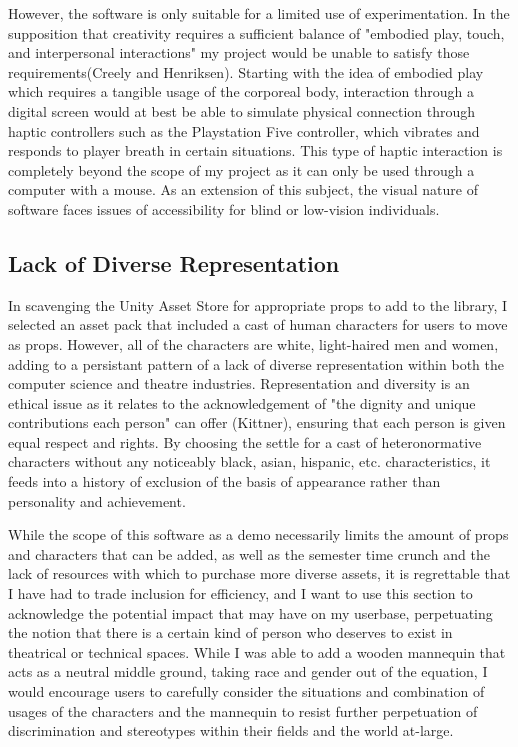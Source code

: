 \documentclass[10pt,twocolumn]{article}
\begin{document}
However, the software is only suitable for a limited use of experimentation. In the supposition that creativity requires a sufficient balance of "embodied play, touch, and interpersonal interactions" my project would be unable to satisfy those requirements(Creely and Henriksen). Starting with the idea of embodied play which requires a tangible usage of the corporeal body, interaction through a digital screen would at best be able to simulate physical connection through haptic controllers such as the Playstation Five controller, which vibrates and responds to player breath in certain situations. This type of haptic interaction is completely beyond the scope of my project as it can only be used through a computer with a mouse. As an extension of this subject, the visual nature of software faces issues of accessibility for blind or low-vision individuals.
\subsection{Lack of Diverse Representation}
In scavenging the Unity Asset Store for appropriate props to add to the library, I selected an asset pack that included a cast of human characters for users to move as props. However, all of the characters are white, light-haired men and women, adding to a persistant pattern of a lack of diverse representation within both the computer science and theatre industries. Representation and diversity is an ethical issue as it relates to the acknowledgement of "the dignity and unique contributions each person" can offer (Kittner), ensuring that each person is given equal respect and rights. By choosing the settle for a cast of heteronormative characters without any noticeably black, asian, hispanic, etc. characteristics, it feeds into a history of exclusion of the basis of appearance rather than personality and achievement. 

While the scope of this software as a demo necessarily limits the amount of props and characters that can be added, as well as the semester time crunch and the lack of resources with which to purchase more diverse assets, it is regrettable that I have had to trade inclusion for efficiency, and I want to use this section to acknowledge the potential impact that may have on my userbase, perpetuating the notion that there is a certain kind of person who deserves to exist in theatrical or technical spaces. While I was able to add a wooden mannequin that acts as a neutral middle ground, taking race and gender out of the equation, I would encourage users to carefully consider the situations and combination of usages of the characters and the mannequin to resist further perpetuation of discrimination and stereotypes within their fields and the world at-large. 
\end{document}
